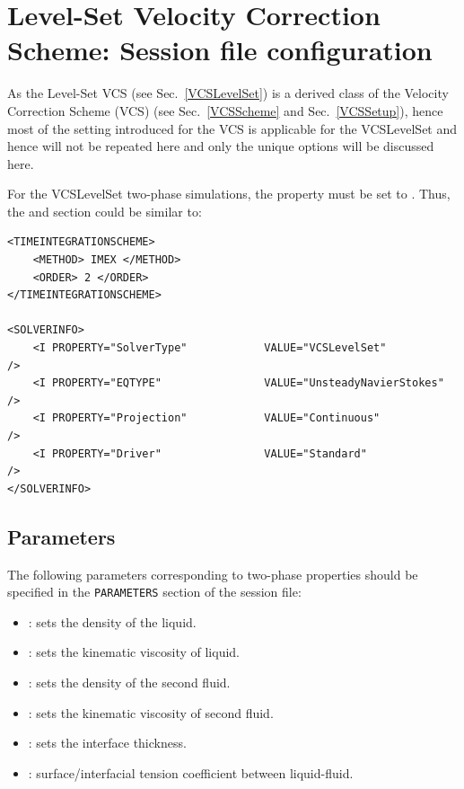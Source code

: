 \section{Level-Set Velocity Correction Scheme: Session file configuration}
As the Level-Set VCS (see Sec.~\ref{VCSLevelSet}) is a derived class of the Velocity Correction Scheme (VCS) (see Sec.~\ref{VCSScheme} and Sec.~\ref{VCSSetup}), hence most of the setting introduced for the VCS is applicable for the VCSLevelSet and hence will not be repeated here and only the unique options will be discussed here.

For the VCSLevelSet two-phase simulations, the property  must be set to . Thus, the  and  section could be similar to:

\begin{lstlisting}[style=XMLStyle]
<TIMEINTEGRATIONSCHEME>
    <METHOD> IMEX </METHOD>
    <ORDER> 2 </ORDER>
</TIMEINTEGRATIONSCHEME>

<SOLVERINFO>
    <I PROPERTY="SolverType"            VALUE="VCSLevelSet"              />
    <I PROPERTY="EQTYPE"                VALUE="UnsteadyNavierStokes"     />
    <I PROPERTY="Projection"            VALUE="Continuous"               />
    <I PROPERTY="Driver"                VALUE="Standard"                 />
</SOLVERINFO>
\end{lstlisting}

\subsection{Parameters}
The following parameters corresponding to two-phase properties should be specified in the \texttt{PARAMETERS} section of the session file:

\begin{itemize}
\item {}: sets the density of the liquid.
\item {}: sets the kinematic viscosity of liquid.
\item {}: sets the density of the second fluid.
\item {}: sets the kinematic viscosity of second fluid.
\item {}: sets the interface thickness.
\item {}: surface/interfacial tension coefficient between liquid-fluid.
\end{itemize}


